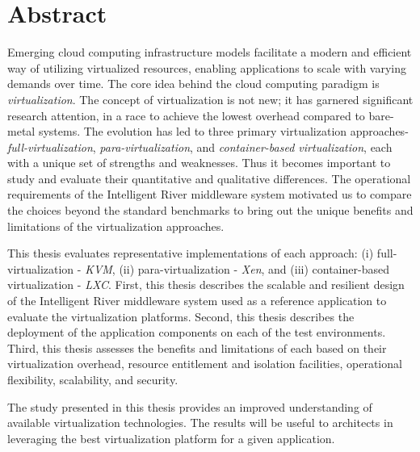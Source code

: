 \chapter*{Abstract}



Emerging cloud computing infrastructure models facilitate a modern and efficient way of utilizing virtualized resources, enabling applications to scale with varying demands over time. The core idea behind the cloud computing paradigm is \textit{virtualization}. The concept of virtualization is not new; it has garnered significant research attention, in a race to achieve the lowest overhead compared to bare-metal systems. The evolution has led to three primary virtualization approaches- \textit{full-virtualization}, \textit{para-virtualization}, and \textit{container-based virtualization}, each with a unique set of strengths and weaknesses.  Thus it becomes important to study and evaluate their quantitative and qualitative differences. The operational requirements of the Intelligent River\textsuperscript{\textregistered} middleware system motivated us to compare the choices beyond the standard benchmarks to bring out the unique benefits and limitations of the virtualization approaches.


This thesis evaluates representative implementations of each approach: (i) full-virtualization - \textit{KVM}, (ii) para-virtualization - \textit{Xen}, and (iii) container-based virtualization - \textit{LXC}. First, this thesis describes the scalable and resilient design of the Intelligent River\textsuperscript{\textregistered} middleware system used as a reference application to evaluate the virtualization platforms. Second, this thesis describes the deployment of the application components on each of the test environments. Third, this thesis assesses the benefits and limitations of each based on their virtualization overhead, resource entitlement and isolation facilities, operational flexibility, scalability, and security.



The study presented in this thesis provides an improved understanding of available virtualization technologies. The results will be useful to  architects in leveraging the best virtualization platform for a given application.

